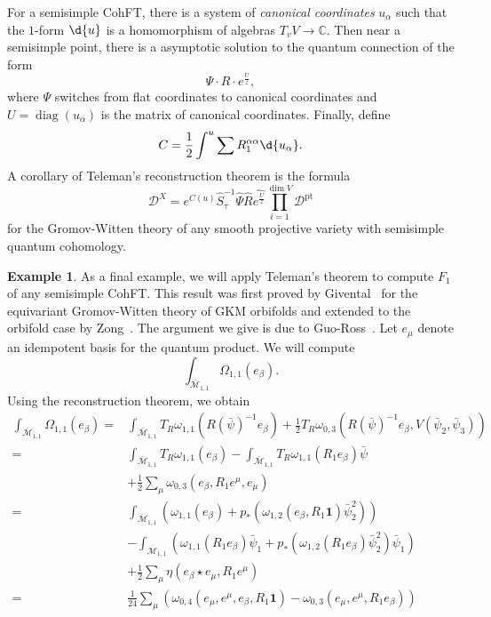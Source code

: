 \documentclass[10pt]{amsart}
\theoremstyle{definition}
\newtheorem{exm}[thm]{Example}
\theoremstyle{remark}
\theoremstyle{plain}
\theoremstyle{definition}
\theoremstyle{remark}
\newcommand{\C}{\mathbb{C}}
\newcommand{\Mbar}{\overline{\mathcal{M}}}
\newcommand{\mc}[1]{\mathcal{#1}}
\newcommand{\mr}[1]{\mathrm{#1}}
\newcommand{\on}[1]{\operatorname{#1}}
\newcommand{\wh}[1]{\widehat{#1}}
\newcommand{\1}{\mathbf{1}}
\newcommand{\2}{\mathbf{2}}
\newcommand{\3}{\mathbf{3}}
\begin{document}
For a semisimple CohFT, there is a system of \textit{canonical coordinates} $u_{\alpha}$ such that the $1$-form $\d{u}$ is a homomorphism of algebras $T_v V \to \C$. Then near a semisimple point, there is a asymptotic solution to the quantum connection of the form
\[ \Psi \cdot  R \cdot e^{\frac{U}{z}}, \]
where $\Psi$ switches from flat coordinates to canonical coordinates and $U = \on{diag}(u_{\alpha})$ is the matrix of canonical coordinates. Finally, define
\[ C = \frac{1}{2} \int^u \sum R_1^{\alpha\alpha} \d{u_{\alpha}}. \]
A corollary of Teleman's reconstruction theorem is the formula
\[ \mc{D}^X = e^{C(u)} \hat{S}^{-1}_{\tau} \hat{\Psi} \hat{R} \wh{e^{\frac{U}{z}}} \prod_{i=1}^{\dim V} \mc{D}^{\mr{pt}} \]
for the Gromov-Witten theory of any smooth projective variety with semisimple quantum cohomology.

\begin{exm}
    As a final example, we will apply Teleman's theorem to compute $F_1$ of any semisimple CohFT. This result was first proved by Givental~\cite{ellgwmirror} for the equivariant Gromov-Witten theory of GKM orbifolds and extended to the orbifold case by Zong~\cite{zythesis}. The argument we give is due to Guo-Ross~\cite{g1mslg}. Let $e_{\mu}$ denote an idempotent basis for the quantum product. We will compute
    \[ \int_{\Mbar_{1,1}} \Omega_{1,1}(e_{\beta}). \]
    Using the reconstruction theorem, we obtain
    \begin{align*}
        \int_{\Mbar_{1,1}}\Omega_{1,1}(e_{\beta}) ={}& \int_{\Mbar_{1,1}} T_R \omega_{1,1}(R(\bar{\psi})^{-1} e_{\beta}) + \frac{1}{2} T_R \omega_{0,3}(R(\bar{\psi})^{-1} e_{\beta}, V(\bar{\psi}_2, \bar{\psi}_3)) \\
        ={}& \int_{\Mbar_{1,1}}T_R\omega_{1,1}(e_{\beta}) - \int_{\Mbar_{1,1}} T_R \omega_{1,1}(R_1 e_{\beta})\bar{\psi} \\ 
        &+ \frac{1}{2}\sum_{\mu}  \omega_{0,3}(e_{\beta}, R_1 e^{\mu}, e_{\mu}) \\
        ={}& \int_{\Mbar_{1,1}} ( \omega_{1,1}(e_{\beta}) + p_* ( \omega_{1,2}(e_{\beta}, R_1 \1) \bar{\psi}_2^2 )) \\
        &- \int_{\Mbar_{1,1}} (\omega_{1,1}(R_1 e_{\beta})\bar{\psi}_1 + p_* ( \omega_{1,2}(R_1 e_{\beta}) \bar{\psi}_2^2 ) \bar{\psi}_1) \\
        &+ \frac{1}{2} \sum_{\mu} \eta(e_{\beta} \star e_{\mu}, R_1 e^{\mu}) \\
        ={}& \frac{1}{24} \sum_{\mu} ( \omega_{0,4}(e_{\mu}, e^{\mu}, e_{\beta}, R_1 \1) -\omega_{0,3}(e_{\mu}, e^{\mu}, R_1 e_{\beta}) )\\

\end{align*}
\end{exm}
\end{document}
